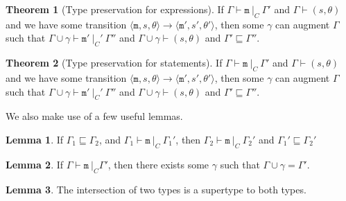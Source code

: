 \documentclass[12pt,a4paper,twoside,openright]{report}
\theoremstyle{definition}
\theoremstyle{dotless}
\newtheorem{lemma}{Lemma}[section]
\newtheorem{theorem}{Theorem}[section]
\newcommand{\transition}[6]{\langle{}\mathtt{#1},#2,#3\rangle{}\rightarrow{}\langle{}\mathtt{#4},#5,#6\rangle}
\begin{document}
\begin{theorem}[Type preservation for expressions]\label{expPreservation}
	If $\Gamma\vdash \mathtt{m}\ |_C\ \Gamma'$ and $\Gamma\vdash(s, \theta)$ and we have some
	transition $\transition{m}{s}{\theta}{m'}{s'}{\theta'}$, then some $\gamma$ can augment $\Gamma$ such that
	$\Gamma\cup\gamma\vdash\mathtt{m'}\ |_C'\ \Gamma''$ and $\Gamma\cup\gamma\vdash(s,\theta)$ and
	$\Gamma'\sqsubseteq\Gamma''$.
\end{theorem}
\begin{theorem}[Type preservation for statements]\label{mPreservation}
	If $\Gamma\vdash \mathtt{m}\ |_C\ \Gamma'$ and $\Gamma\vdash(s, \theta)$ and we have some
	transition $\transition{m}{s}{\theta}{m'}{s'}{\theta'}$, then some $\gamma$ can augment $\Gamma$ such that
	$\Gamma\cup\gamma\vdash\mathtt{m'}\ |_C'\ \Gamma''$ and $\Gamma\cup\gamma\vdash(s,\theta)$ and 
	$\Gamma'\sqsubseteq\Gamma''$.
\end{theorem}

We also make use of a few useful lemmas.
\begin{lemma}
  \label{lm:strChain}
  If $\Gamma_1 \sqsubseteq \Gamma_2$, and $\Gamma_1\vdash\mathtt{m}\ |_C\ \Gamma_1'$, 
  then $\Gamma_2\vdash\mathtt{m}\ |_C\ \Gamma_2'$ and
  $\Gamma_1'\sqsubseteq\Gamma_2'$ 
\end{lemma}
\begin{lemma}
  \label{lm:ext}
  If $\Gamma\vdash\mathtt{m}\ |_C\Gamma'$, then there exists some $\gamma$ such
  that $\Gamma\!\cup\!\gamma=\Gamma'$.
\end{lemma}
\begin{lemma}
  \label{lm:intersect}
	The intersection of two types is a supertype to both types. 
\end{lemma}
\end{document}
